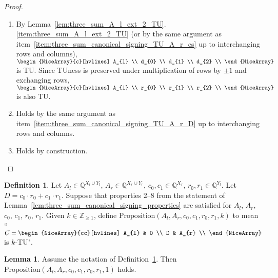 \documentclass{article}
\theoremstyle{definition}
\newtheorem{lemma}[theorem]{Lemma}
\newtheorem{definition}[theorem]{Definition}
\begin{document}
\begin{proof}
\begin{enumerate}
        \item By Lemma~\ref{lem:three_sum_A_l_ext_2_TU}.\ref{item:three_sum_A_l_ext_2_TU} (or by the same argument as item~\ref{item:three_sum_canonical_signing_TU_A_r_cs} up to interchanging rows and columns),\\ $\begin{NiceArray}{c}[hvlines] A_{l} \\ d_{0} \\ d_{1} \\ d_{2} \\ \end{NiceArray}$ is TU. Since TUness is preserved under multiplication of rows by $\pm 1$ and exchanging rows, $\begin{NiceArray}{c}[hvlines] A_{l} \\ r_{0} \\ r_{1} \\ r_{2} \\ \end{NiceArray}$ is also TU.
        \item Holds by the same argument as item~\ref{item:three_sum_canonical_signing_TU_A_r_D} up to interchanging rows and columns.
        \item Holds by construction.
    \end{enumerate}
\end{proof}

\begin{definition}\label{def:three_sum_alt_form}
    Let $A_{l} \in \mathbb{Q}^{X_{l} \cup Y_{l}}$, $A_{r} \in \mathbb{Q}^{X_{r} \cup Y_{r}}$, $c_{0}, c_{1} \in \mathbb{Q}^{X_{r}}$, $r_{0}, r_{1} \in \mathbb{Q}^{Y_{l}}$. Let $D = c_{0} \cdot r_{0} + c_{1} \cdot r_{1}$. Suppose that properties 2--8 from the statement of Lemma~\ref{lem:three_sum_canonical_signing_properties} are satisfied for $A_{l}$, $A_{r}$, $c_{0}$, $c_{1}$, $r_{0}$, $r_{1}$. Given $k \in \mathbb{Z}_{\geq 1}$, define $\mathrm{Proposition}(A_{l}, A_{r}, c_{0}, c_{1}, r_{0}, r_{1}, k)$ to mean ``$C = \begin{NiceArray}{cc}[hvlines] A_{l} & 0 \\ D & A_{r} \\ \end{NiceArray}$ is $k$-TU".
\end{definition}

\begin{lemma}\label{lem:three_sum_alt_form_1_TU}
    Assume the notation of Definition~\ref{def:three_sum_alt_form}. Then $\mathrm{Proposition}(A_{l}, A_{r}, c_{0}, c_{1}, r_{0}, r_{1}, 1)$ holds.
\end{lemma}
\end{document}

